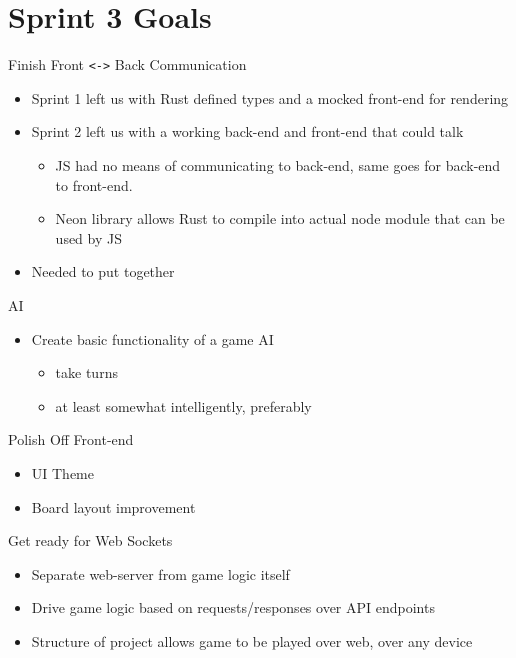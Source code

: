 \documentclass[allowframebreaks]{beamer}
\begin{document}
\section{Sprint 3 Goals}
\label{sec:orgb3ef0ef}
\begin{frame}[fragile,label={sec:orgf6c4e28}]{Finish Front \texttt{<->} Back Communication}
 \begin{itemize}
\item Sprint 1 left us with Rust defined types and a mocked front-end for rendering
\item Sprint 2 left us with a working back-end and front-end that could talk
\begin{itemize}
\item JS had no means of communicating to back-end, same goes for back-end to front-end.
\item Neon library allows Rust to compile into actual node module that can be used by JS
\end{itemize}
\item Needed to put together
\end{itemize}
\end{frame}
\begin{frame}[label={sec:org96a3364}]{AI}
\begin{itemize}
\item Create basic functionality of a game AI
\begin{itemize}
\item take turns
\item at least somewhat intelligently, preferably
\end{itemize}
\end{itemize}
\end{frame}
\begin{frame}[label={sec:orgd12d0ab}]{Polish Off Front-end}
\begin{itemize}
\item UI Theme
\item Board layout improvement
\end{itemize}
\end{frame}
\begin{frame}[label={sec:org17dd706}]{Get ready for Web Sockets}
\begin{itemize}
\item Separate web-server from game logic itself
\item Drive game logic based on requests/responses over API endpoints
\item Structure of project allows game to be played over web, over any device
\end{itemize}
\end{frame}
\end{document}
